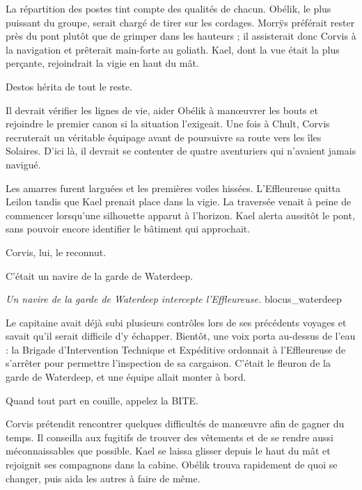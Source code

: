 La répartition des postes tint compte des qualités de chacun. Obélik, le plus puissant du groupe, serait chargé de tirer sur les cordages. Morrÿs préférait rester près du pont plutôt que de grimper dans les hauteurs ; il assisterait donc Corvis à la navigation et prêterait main-forte au goliath. Kael, dont la vue était la plus perçante, rejoindrait la vigie en haut du mât.

Destos hérita de tout le reste.

Il devrait vérifier les lignes de vie, aider Obélik à manœuvrer les bouts et rejoindre le premier canon si la situation l'exigeait. Une fois à Chult, Corvis recruterait un véritable équipage avant de poursuivre sa route vers les îles Solaires. D'ici là, il devrait se contenter de quatre aventuriers qui n'avaient jamais navigué.

Les amarres furent larguées et les premières voiles hissées. L'Effleureuse quitta Leilon tandis que Kael prenait place dans la vigie. La traversée venait à peine de commencer lorsqu'une silhouette apparut à l'horizon. Kael alerta aussitôt le pont, sans pouvoir encore identifier le bâtiment qui approchait.

Corvis, lui, le reconnut.

C'était un navire de la garde de Waterdeep.

{\textit{Un navire de la garde de Waterdeep intercepte l'Effleureuse.}}
{blocus_waterdeep}

Le capitaine avait déjà subi plusieurs contrôles lors de ses précédents voyages et savait qu'il serait difficile d'y échapper. Bientôt, une voix porta au-dessus de l'eau : la Brigade d'Intervention Technique et Expéditive ordonnait à l'Effleureuse de s'arrêter pour permettre l'inspection de sa cargaison. C'était le fleuron de la garde de Waterdeep, et une équipe allait monter à bord.

\begin{narrateur}
Quand tout part en couille, appelez la BITE.
\end{narrateur}

Corvis prétendit rencontrer quelques difficultés de manœuvre afin de gagner du temps. Il conseilla aux fugitifs de trouver des vêtements et de se rendre aussi méconnaissables que possible. Kael se laissa glisser depuis le haut du mât et rejoignit ses compagnons dans la cabine. Obélik trouva rapidement de quoi se changer, puis aida les autres à faire de même.

\scenebreak


